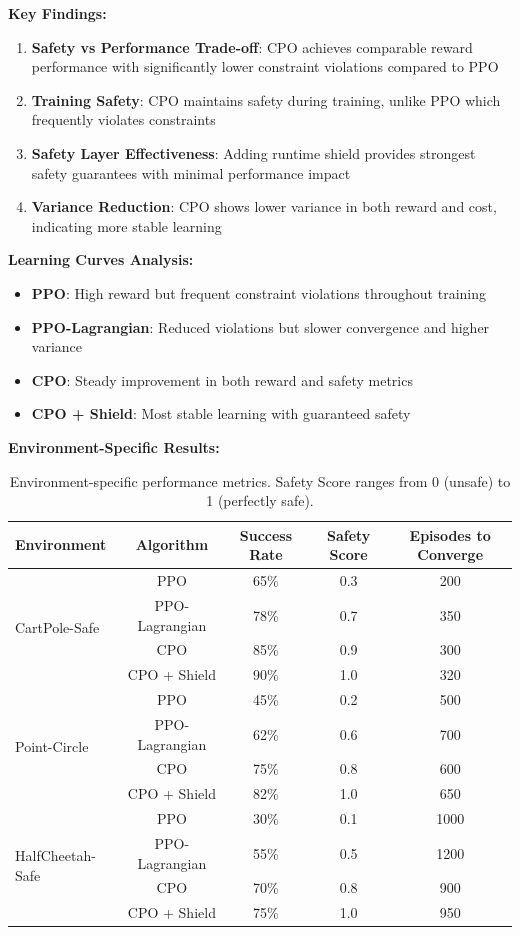 \documentclass[12pt]{article}
\begin{document}
{{{{\textbf{Key Findings:}
\begin{enumerate}
\item \textbf{Safety vs Performance Trade-off}: CPO achieves comparable reward performance with significantly lower constraint violations compared to PPO
\item \textbf{Training Safety}: CPO maintains safety during training, unlike PPO which frequently violates constraints
\item \textbf{Safety Layer Effectiveness}: Adding runtime shield provides strongest safety guarantees with minimal performance impact
\item \textbf{Variance Reduction}: CPO shows lower variance in both reward and cost, indicating more stable learning
\end{enumerate}

\textbf{Learning Curves Analysis:}
\begin{itemize}
\item \textbf{PPO}: High reward but frequent constraint violations throughout training
\item \textbf{PPO-Lagrangian}: Reduced violations but slower convergence and higher variance
\item \textbf{CPO}: Steady improvement in both reward and safety metrics
\item \textbf{CPO + Shield}: Most stable learning with guaranteed safety
\end{itemize}

\textbf{Environment-Specific Results:}
\begin{table}[H]
\centering
\begin{tabular}{|l|c|c|c|c|}
\hline
\textbf{Environment} & \textbf{Algorithm} & \textbf{Success Rate} & \textbf{Safety Score} & \textbf{Episodes to Converge} \\
\hline
\multirow{4}{*}{CartPole-Safe} & PPO & 65\% & 0.3 & 200 \\
& PPO-Lagrangian & 78\% & 0.7 & 350 \\
& CPO & 85\% & 0.9 & 300 \\
& CPO + Shield & 90\% & 1.0 & 320 \\
\hline
\multirow{4}{*}{Point-Circle} & PPO & 45\% & 0.2 & 500 \\
& PPO-Lagrangian & 62\% & 0.6 & 700 \\
& CPO & 75\% & 0.8 & 600 \\
& CPO + Shield & 82\% & 1.0 & 650 \\
\hline
\multirow{4}{*}{HalfCheetah-Safe} & PPO & 30\% & 0.1 & 1000 \\
& PPO-Lagrangian & 55\% & 0.5 & 1200 \\
& CPO & 70\% & 0.8 & 900 \\
& CPO + Shield & 75\% & 1.0 & 950 \\
\hline
\end{tabular}
\caption{Environment-specific performance metrics. Safety Score ranges from 0 (unsafe) to 1 (perfectly safe).}
\end{table}

}}}}
\end{document}
